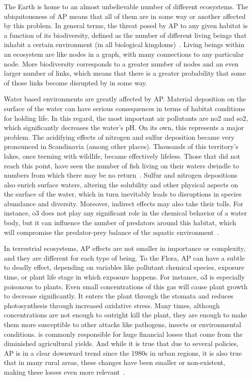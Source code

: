 The Earth is home to an almost unbelievable number of different
ecosystems. The ubiquitousness of \gls{AP} means that all of them are in
some way or another affected by this problem. In general terms, the
threat posed by \gls{AP} to any given habitat is a function of its
biodiversity, defined as the number of different living beings that
inhabit a certain environment (in all biological
kingdoms)~\cite{OxfordPress2020}. Living beings within an ecosystem are
like nodes in a graph, with many connections to any particular node.
More biodiversity corresponds to a greater number of nodes and an even
larger number of links,  which means that there is a greater probability
that some of those links become disrupted by  in some way.

Water based environments are greatly affected by \gls{AP}. Material
deposition on the surface of the water can have serious consequences in
terms of habitat conditions for holding life. In this regard, the most
important air pollutants are \gls{no2} and \gls{so2},  which
significantly decreases the water's pH. On its own, this represents a
major problem. The acidifying effects of nitrogen and sulfur deposition
became very pronounced in Scandinavia (among other places). Thousands of
this territory's lakes, once teeming with wildlife, became effectively
lifeless. Those that did not reach this point, have seen the number of
fish living on their waters dwindle to numbers from which there may be
no return~\cite{DeWit2015}. Sulfur and nitrogen depositions also enrich
surface waters, altering the solubility and other physical aspects on
the surface of the water, which in turn inevitably leads to disruptions
in species abundance and diversity. Moreover, indirect effects may also
take their tolls. For instance, \gls{o3} does not play any significant
role in the chemical behavior of a water body, but it can influence the
number of predators around this habitat, which will compromise the
predator-prey balance of the aquatic environment~\cite{Vallero2014,
Lovett2009}.

In terrestrial ecosystems, \gls{AP} effects are not smaller in
importance or complexity, and they are different for each type of being.
To the Flora, \gls{AP} can have a subtle to deadly effect, depending on
variables like pollutant chemical species, exposure time, or plant life
stage in which exposure happens. For instance, \gls{o3} is especially
poisonous to plants. Even small concentrations of this gas will cause
plant growth to decrease significantly. It enters the plant through the
stomata and reduces photosynthesis through increased oxidative stress.
Many times, although concentrations are not enough to outright kill the
plant, they are enough to make them more susceptible to other attacks
like pathogens, insects or environmental conditions.  is
commonly responsible for huge financial losses that come from the
diminished agricultural yields. And while it is true that due to several
policies, \gls{AP} is in a clear downward trend since the 1980s in urban
regions, it is also true that in many rural areas, these changes have
been smaller or non-existent, making these losses even more
relevant~\cite{Lovett2009, Vallero2014}.

